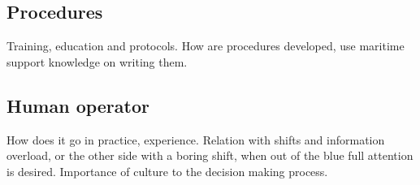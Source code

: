\subsection{Procedures}
Training, education and protocols. How are procedures developed, use maritime support knowledge on writing them.

\subsection{Human operator}
How does it go in practice, experience. Relation with shifts and information overload, or the other side with a boring shift, when out of the blue full attention is desired. Importance of culture to the decision making process.

